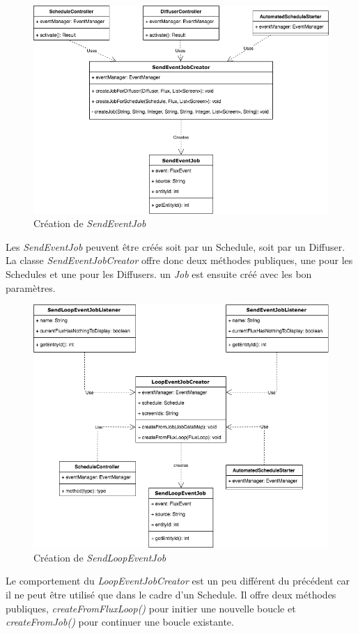 \documentclass[french]{article}
\begin{document}
\begin{figure}[h]
	\centering	
	\includegraphics[width=0.7\linewidth]{schemas/job_creation.png}%
	\caption{Création de \textit{SendEventJob}}
\end{figure}

Les \textit{SendEventJob} peuvent être créés soit par un Schedule, soit par un Diffuser. La classe \textit{SendEventJobCreator} offre donc deux méthodes publiques, une pour les Schedules et une pour les Diffusers. un \textit{Job} est ensuite créé avec les bon paramètres.


\begin{figure}[h]
	\centering	
	\includegraphics[width=0.7\linewidth]{schemas/loop_job_creation.png}%
	\caption{Création de \textit{SendLoopEventJob}}
\end{figure}

Le comportement du \textit{LoopEventJobCreator} est un peu différent du précédent car il ne peut être utilisé que dans le cadre d'un Schedule. Il offre deux méthodes publiques, \textit{createFromFluxLoop()} pour initier une nouvelle boucle et \textit{createFromJob()} pour continuer une boucle existante. \newline
\end{document}
